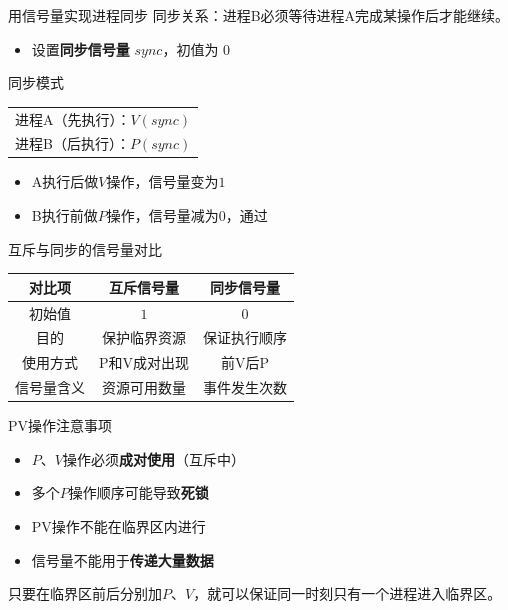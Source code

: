 \documentclass[10pt, aspectratio=169]{beamer}
\begin{document}
\begin{frame}{用信号量实现进程同步}
    同步关系：进程B必须等待进程A完成某操作后才能继续。

    \vspace{0.5em}
    \begin{itemize}
        \item 设置\textbf{同步信号量} $sync$，初值为 $0$
    \end{itemize}
    \vspace{0.5em}
    \begin{block}{同步模式}
        \begin{tabular}{l}
            进程A（先执行）：\quad $V(sync)$ \\
            进程B（后执行）：\quad $P(sync)$ \\
        \end{tabular}
    \end{block}
    \vspace{0.5em}
    \begin{itemize}
        \item A执行后做$V$操作，信号量变为$1$
        \item B执行前做$P$操作，信号量减为$0$，通过
    \end{itemize}
\end{frame}

\begin{frame}{互斥与同步的信号量对比}
    \begin{tabular}{|c|c|c|}
        \hline
        对比项 & 互斥信号量 & 同步信号量 \\
        \hline
        初始值 & $1$ & $0$ \\
        目的 & 保护临界资源 & 保证执行顺序 \\
        使用方式 & P和V成对出现 & 前V后P \\
        信号量含义 & 资源可用数量 & 事件发生次数 \\
        \hline
    \end{tabular}
\end{frame}

\begin{frame}{PV操作注意事项}
    \begin{itemize}
        \item $P$、$V$操作必须\textbf{成对使用}（互斥中）
        \item 多个$P$操作顺序可能导致\textbf{死锁}
        \item PV操作不能在临界区内进行
        \item 信号量不能用于\textbf{传递大量数据}
    \end{itemize}
    \vspace{0.5em}
    \begin{exampleblock}
        只要在临界区前后分别加$P$、$V$，就可以保证同一时刻只有一个进程进入临界区。
    \end{exampleblock}
\end{frame}
\end{document}
